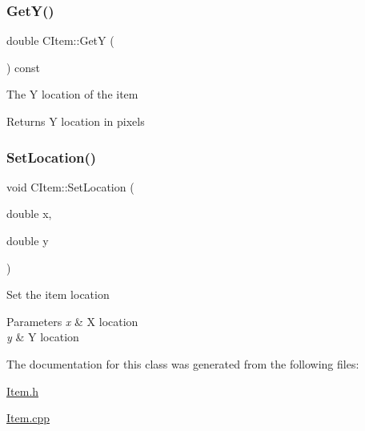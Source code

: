 \subsubsection{\texorpdfstring{Get\+Y()}{GetY()}}
{\footnotesize\ttfamily double C\+Item\+::\+GetY (\begin{DoxyParamCaption}{ }\end{DoxyParamCaption}) const\hspace{0.3cm}{\ttfamily [inline]}}

The Y location of the item \begin{DoxyReturn}{Returns}
Y location in pixels 
\end{DoxyReturn}
\mbox{\label{class_c_item_a9c194f3f08e515853600cecca3e6d319}} 
\subsubsection{\texorpdfstring{Set\+Location()}{SetLocation()}}
{\footnotesize\ttfamily void C\+Item\+::\+Set\+Location (\begin{DoxyParamCaption}\item[{double}]{x,  }\item[{double}]{y }\end{DoxyParamCaption})\hspace{0.3cm}{\ttfamily [inline]}}

Set the item location 
\begin{DoxyParams}{Parameters}
{\em x} & X location \\
\hline
{\em y} & Y location \\
\hline
\end{DoxyParams}


The documentation for this class was generated from the following files\+:\begin{DoxyCompactItemize}
\item 
\mbox{\hyperlink{_item_8h}{Item.\+h}}\item 
\mbox{\hyperlink{_item_8cpp}{Item.\+cpp}}\end{DoxyCompactItemize}
